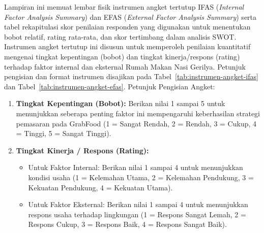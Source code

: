 \label{app:instrumen-rekapitulasi-angket-ifas-efas}

Lampiran ini memuat lembar fisik instrumen angket tertutup IFAS (\textit{Internal Factor Analysis Summary}) dan EFAS (\textit{External Factor Analysis Summary}) serta tabel rekapitulasi skor penilaian responden yang digunakan untuk menentukan bobot relatif, rating rata-rata, dan skor tertimbang dalam analisis SWOT.
Instrumen angket tertutup ini disusun untuk memperoleh penilaian kuantitatif mengenai tingkat kepentingan (bobot) dan tingkat kinerja/respons (rating) terhadap faktor internal dan eksternal Rumah Makan Nasi Gerilya. Petunjuk pengisian dan format instrumen disajikan pada Tabel~\ref{tab:instrumen-angket-ifas} dan Tabel~\ref{tab:instrumen-angket-efas}. Petunjuk Pengisian Angket:
\begin{enumerate}
    \item \textbf{Tingkat Kepentingan (Bobot):} Berikan nilai 1 sampai 5 untuk menunjukkan seberapa penting faktor ini mempengaruhi keberhasilan strategi pemasaran pada GrabFood (1 = Sangat Rendah, 2 = Rendah, 3 = Cukup, 4 = Tinggi, 5 = Sangat Tinggi).
    \item \textbf{Tingkat Kinerja / Respons (Rating):} 
    \begin{itemize}
        \item Untuk Faktor Internal: Berikan nilai 1 sampai 4 untuk menunjukkan kondisi usaha (1 = Kelemahan Utama, 2 = Kelemahan Pendukung, 3 = Kekuatan Pendukung, 4 = Kekuatan Utama).
        \item Untuk Faktor Eksternal: Berikan nilai 1 sampai 4 untuk menunjukkan respons usaha terhadap lingkungan (1 = Respons Sangat Lemah, 2 = Respons Cukup, 3 = Respons Baik, 4 = Respons Sangat Baik).
    \end{itemize}
\end{enumerate}

